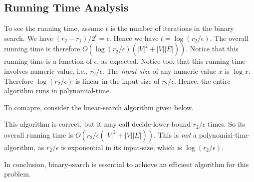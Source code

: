 \subsection*{Running Time Analysis}

To see the running time, assume $t$ is the number of iterations in the binary search.
We have $(r_2 - r_1) / 2^t = \epsilon$. Hence we have $t = \log (r_2 / \epsilon)$.
The overall running time is therefore $O(\log (r_2 / \epsilon) (|V|^2 + |V||E|))$.
Notice that this running time is a function of $\epsilon$, as expected.
Notice too, that this running time involves numeric value, i.e., $r_2 / \epsilon$.
The \emph{input-size} of any numeric value $x$ is $\log x$.
Therefore $\log(r_2 / \epsilon)$ is linear in the input-size of $r_2/\epsilon$.
Hence, the entire algorithm runs in polynomial-time.

To comapre, consider the linear-search algorithm given below.

\begin{minipage}{0.8\textwidth}
	\xxx
	\xxx
	\xxx
	\xxx
	\aab {else: return $(r - \epsilon, r]$;}\xxx
	\xxx
\end{minipage}

This algorithm is correct, but it may call decide-lower-bound $r_2 / \epsilon$ times.
So its overall running time is $O(r_2 / \epsilon (|V|^2 + |V||E|))$.
This is \emph{not} a polynomial-time algorithm,
as $r_2 / \epsilon$ is exponential in its input-size, which is $\log(r_2/\epsilon)$.

In conclusion, binary-search is essential to achieve an efficient algorithm for this problem.


